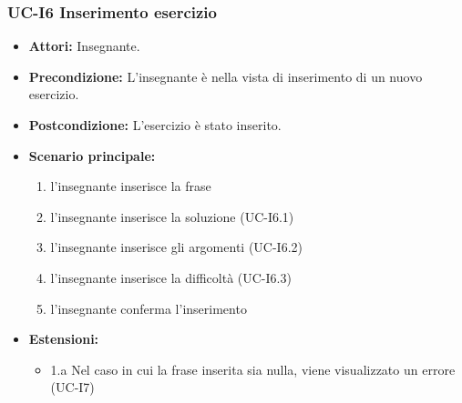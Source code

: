 \subsubsection{UC-I6 Inserimento esercizio}
	\begin{itemize}
		\item \textbf{Attori: }Insegnante.
		\item \textbf{Precondizione: }L'insegnante è nella vista di inserimento di un nuovo esercizio.
		\item \textbf{Postcondizione: }L'esercizio è stato inserito.
		\item \textbf{Scenario principale: }
			\begin{enumerate} 
				\item l'insegnante inserisce la frase
				\item l'insegnante inserisce la soluzione (UC-I6.1)
				\item l'insegnante inserisce gli argomenti (UC-I6.2)
				\item l'insegnante inserisce la difficoltà (UC-I6.3)
				\item l'insegnante conferma l'inserimento
			\end{enumerate}
		\item \textbf{Estensioni:} 
			\begin{itemize}
				\item 1.a Nel caso in cui la frase inserita sia nulla, viene visualizzato un errore (UC-I7)
			\end{itemize}
	\end{itemize}
	
